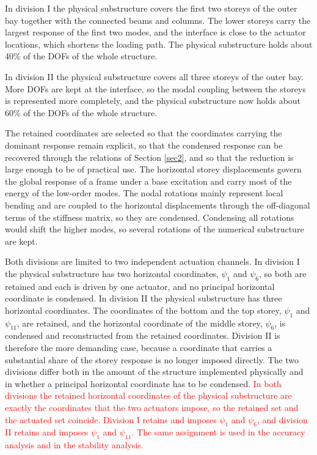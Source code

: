 \documentclass[11pt,a4paper]{article}
\numberwithin{equation}{section}
\newcommand{\rev}[1]{\textcolor{red}{#1}}
\begin{document}
In division I the physical substructure covers the first two storeys of the outer bay together with the connected beams and columns. The lower storeys carry the largest response of the first two modes, and the interface is close to the actuator locations, which shortens the loading path. The physical substructure holds about 40\% of the DOFs of the whole structure.

In division II the physical substructure covers all three storeys of the outer bay. More DOFs are kept at the interface, so the modal coupling between the storeys is represented more completely, and the physical substructure now holds about 60\% of the DOFs of the whole structure.

The retained coordinates are selected so that the coordinates carrying the dominant response remain explicit, so that the condensed response can be recovered through the relations of Section \ref{sec2}, and so that the reduction is large enough to be of practical use. The horizontal storey displacements govern the global response of a frame under a base excitation and carry most of the energy of the low-order modes. The nodal rotations mainly represent local bending and are coupled to the horizontal displacements through the off-diagonal terms of the stiffness matrix, so they are condensed. Condensing all rotations would shift the higher modes, so several rotations of the numerical substructure are kept.

Both divisions are limited to two independent actuation channels. In division I the physical substructure has two horizontal coordinates, \(\psi_{1}\) and \(\psi_{6}\), so both are retained and each is driven by one actuator, and no principal horizontal coordinate is condensed. In division II the physical substructure has three horizontal coordinates. The coordinates of the bottom and the top storey, \(\psi_{1}\) and \(\psi_{11}\), are retained, and the horizontal coordinate of the middle storey, \(\psi_{6}\), is condensed and reconstructed from the retained coordinates. Division II is therefore the more demanding case, because a coordinate that carries a substantial share of the storey response is no longer imposed directly. The two divisions differ both in the amount of the structure implemented physically and in whether a principal horizontal coordinate has to be condensed. \rev{In both divisions the retained horizontal coordinates of the physical substructure are exactly the coordinates that the two actuators impose, so the retained set and the actuated set coincide. Division I retains and imposes \(\psi_{1}\) and \(\psi_{6}\), and division II retains and imposes \(\psi_{1}\) and \(\psi_{11}\). The same assignment is used in the accuracy analysis and in the stability analysis.}
\end{document}
